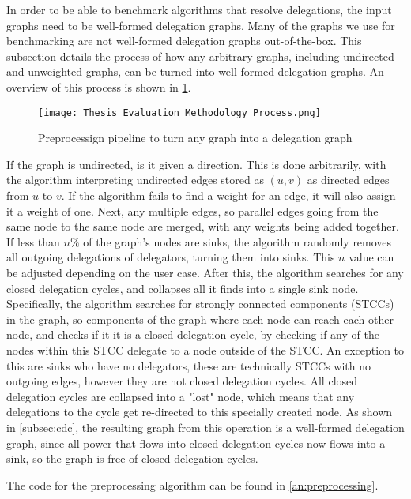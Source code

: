 In order to be able to benchmark algorithms that resolve delegations, the input graphs need to be well-formed delegation graphs. Many of the graphs we use for benchmarking are not well-formed delegation graphs out-of-the-box. This subsection details the process of how any arbitrary graphs, including undirected and unweighted graphs, can be turned into well-formed delegation graphs. An overview of this process is shown in \cref{fig:cleaning_process}.

\begin{figure}[t]
    \centering
    \texttt{[image: Thesis Evaluation Methodology Process.png]}
    \caption{Preprocessign pipeline to turn any graph into a delegation graph}
    \label{fig:cleaning_process}
\end{figure}

If the graph is undirected, is it given a direction. This is done arbitrarily, with the algorithm interpreting undirected edges stored as $(u, v)$ as directed edges from $u$ to $v$. If the algorithm fails to find a weight for an edge, it will also assign it a weight of one. Next, any multiple edges, so parallel edges going from the same node to the same node are merged, with any weights being added together. If less than $n\%$ of the graph's nodes are sinks, the algorithm randomly removes all outgoing delegations of delegators, turning them into sinks. This $n$ value can be adjusted depending on the user case. After this, the algorithm searches for any closed delegation cycles, and collapses all it finds into a single sink node. Specifically, the algorithm searches  for strongly connected components (STCCs) in the graph, so components of the graph where each node can reach each other node, and checks if it it is a closed delegation cycle, by checking if any of the nodes within this STCC delegate to a node outside of the STCC. An exception to this are sinks who have no delegators, these are technically STCCs with no outgoing edges, however they are not closed delegation cycles. All closed delegation cycles are collapsed into a "lost" node, which means that any delegations to the cycle get re-directed to this specially created node. As shown in \cref{subsec:cdc}, the resulting graph from this operation is a well-formed delegation graph, since all power that flows into closed delegation cycles now flows into a sink, so the graph is free of closed delegation cycles.

The code for the preprocessing algorithm can be found in \cref{an:preprocessing}. 

